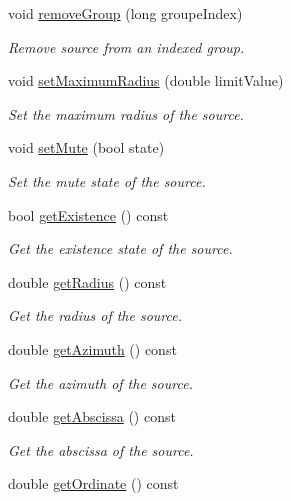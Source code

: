 \begin{DoxyCompactItemize}
void \hyperlink{class_hoa2_d_1_1_source_a9b1ae2dd03c552efc5df9554a4bbb75d}{remove\-Group} (long groupe\-Index)
\begin{DoxyCompactList}\small\item\em Remove source from an indexed group. \end{DoxyCompactList}\item 
void \hyperlink{class_hoa2_d_1_1_source_ac6e71e18e48a887d08f60f2ae3c63195}{set\-Maximum\-Radius} (double limit\-Value)
\begin{DoxyCompactList}\small\item\em Set the maximum radius of the source. \end{DoxyCompactList}\item 
void \hyperlink{class_hoa2_d_1_1_source_a343f4cef2eaf81e118d43883f05170d3}{set\-Mute} (bool state)
\begin{DoxyCompactList}\small\item\em Set the mute state of the source. \end{DoxyCompactList}\item 
bool \hyperlink{class_hoa2_d_1_1_source_aec13c7ac13d276b1635a7d8e8d3fa418}{get\-Existence} () const 
\begin{DoxyCompactList}\small\item\em Get the existence state of the source. \end{DoxyCompactList}\item 
double \hyperlink{class_hoa2_d_1_1_source_aa1ca86804bc72602d4e3d332df912452}{get\-Radius} () const 
\begin{DoxyCompactList}\small\item\em Get the radius of the source. \end{DoxyCompactList}\item 
double \hyperlink{class_hoa2_d_1_1_source_aec1cb1c94d9e0eda417fff2f4baf9567}{get\-Azimuth} () const 
\begin{DoxyCompactList}\small\item\em Get the azimuth of the source. \end{DoxyCompactList}\item 
double \hyperlink{class_hoa2_d_1_1_source_a31246db09e0e569d7c3e9d49283ccfad}{get\-Abscissa} () const 
\begin{DoxyCompactList}\small\item\em Get the abscissa of the source. \end{DoxyCompactList}\item 
double \hyperlink{class_hoa2_d_1_1_source_a4ecf39dab7526d842e894662c439b188}{get\-Ordinate} () const 

\end{DoxyCompactItemize}
